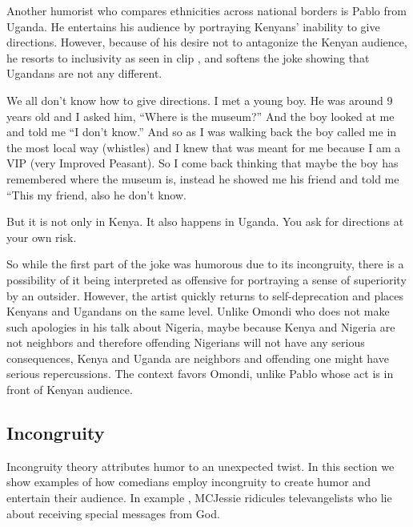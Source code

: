\documentclass[output=paper]{langsci/langscibook}
\begin{document}
Another humorist who compares ethnicities across national borders is Pablo from Uganda. He entertains his audience by portraying Kenyans’ inability to give directions. However, because of his desire not to antagonize the Kenyan audience, he resorts to inclusivity as seen in clip , and softens the joke showing that Ugandans are not any different.

\ea\label{ex:muaka:6}
We all don’t know how to give directions. I met a young boy. He was around 9 years old and I asked him, “Where is the museum?” And the boy looked at me and told me “I don’t know.” And so as I was walking back the boy called me in the most local way \textup{(whistles)} and I knew that was meant for me because I am a VIP (very Improved Peasant). So I come back thinking that maybe the boy has remembered where the museum is, instead he showed me his friend and told me “This my friend, also he don’t know. 
\citep{Omogi2012b}
\z

\ea\label{ex:muaka:7}
 But it is not only in Kenya. It also happens in Uganda. You ask for directions at your own risk. 
 \citep{Omogi2012c}
\z

So while the first part of the joke was humorous due to its incongruity, there is a possibility of it being interpreted as offensive for portraying a sense of superiority by an outsider. However, the artist quickly returns to self-deprecation and places Kenyans and Ugandans on the same level. Unlike Omondi who does not make such apologies in his talk about Nigeria, maybe because Kenya and Nigeria are not neighbors and therefore offending Nigerians will not have any serious consequences, Kenya and Uganda are neighbors and offending one might have serious repercussions. The context favors Omondi, unlike Pablo whose act is in front of Kenyan audience.

\subsection{Incongruity}

Incongruity theory attributes humor to an unexpected twist. In this section we show examples of how comedians employ incongruity to create humor and entertain their audience. In example , MCJessie ridicules televangelists who lie about receiving special messages from God.
\end{document}
